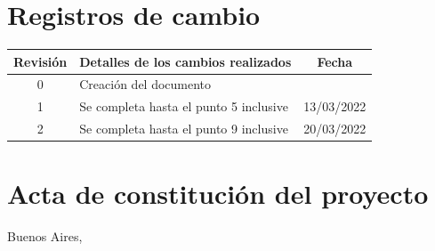 \documentclass[
11pt, %
codirector, %
]{charter}
\begin{document}
\maketitle
\thispagestyle{empty}
\pagebreak


\thispagestyle{empty}
{\setlength{\parskip}{0pt}
	\tableofcontents{}
}
\pagebreak


\section*{Registros de cambio}
\label{sec:registro}


\begin{table}[ht]
	\label{tab:registro}
	\centering
	\begin{tabularx}{\linewidth}{@{}|c|X|c|@{}}
		\hline
		\rowcolor[HTML]{C0C0C0}
		Revisión & \multicolumn{1}{c|}{\cellcolor[HTML]{C0C0C0}Detalles de los cambios realizados} & Fecha            \\ \hline
		0        & Creación del documento                                                          & \fechaInicioName \\ \hline
		1        & Se completa hasta el punto 5 inclusive                                          & 13/03/2022       \\ \hline
		2        & Se completa hasta el punto 9 inclusive                                          & 20/03/2022       \\ \hline
	\end{tabularx}
\end{table}

\pagebreak



\section*{Acta de constitución del proyecto}
\label{sec:acta}

\begin{flushright}
	Buenos Aires, \fechaInicioName
\end{flushright}
\end{document}
